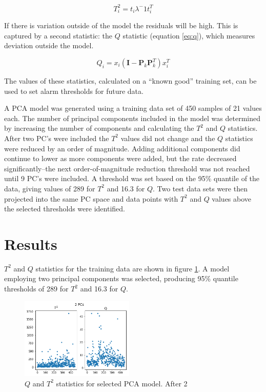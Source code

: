 \documentclass{IEEEtran}
\begin{document}
\begin{equation}
T^2_i = t_i \lambda^-1 t_i^T
\label{eq:t2}
\end{equation}

If there is variation outside of the model the residuals will be high. This is captured by a second statistic: the $Q$ statistic (equation \ref{eq:q}), which measures deviation outside the model.

\begin{equation}
Q_i = x_i ( \mathbf{I} - \mathbf{P}_k \mathbf{P}_k^T ) x_i^T
\label{eq:q}
\end{equation}

The values of these statistics, calculated on a ``known good'' training set, can be used to set alarm thresholds for future data.

A PCA model was generated using a training data set of 450 samples of 21 values each. The number of principal components included in the model was determined by increasing the number of components and calculating the $T^2$ and $Q$ statistics. After two PC's were included the $T^2$ values did not change and the $Q$ statistics were reduced by an order of magnitude. Adding additional components did continue to lower as more components were added, but the rate decreased significantly--the next order-of-magnitude reduction threshold was not reached until 9 PC's were included.  A threshold was set based on the 95\% quantile of the data, giving values of \num{289} for $T^2$ and \num{16.3} for $Q$. Two test data sets were then projected into the same PC space and data points with $T^2$ and $Q$ values above the selected thresholds were identified.

\section{Results}

$T^2$ and $Q$ statistics for the training data are shown in figure \ref{fig:data_q_and_t2}. A model employing two principal components was selected, producing 95\% quantile thresholds of \num{289} for $T^2$ and \num{16.3} for $Q$.

\begin{centering}
\begin{figure}
\centering
\begin{center}
	\includegraphics[width=0.48\textwidth]{data_q_and_t2}
	\caption{$Q$ and $T^2$ statistics for selected PCA model. After 2
			 \label{fig:data_q_and_t2}}
\end{center}
\end{figure}
\end{centering}
\end{document}
